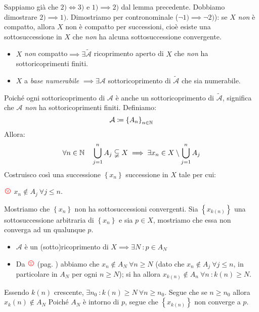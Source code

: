 \begin{demonstration}
Sappiamo già che $2)\iff 3)$ e $1)\implies 2)$ dal lemma precedente. Dobbiamo dimostrare $2)\implies 1)$. Dimostriamo per contronominale ($\neg 1)\implies \neg 2)$): se $X$ \textit{non} è compatto, allora $X$ non è compatto per successioni, cioè esiste una sottosuccessione in $X$ che \textit{non} ha alcuna sottosuccessione convergente.\\
\begin{itemize}
	\item $X$ \textit{non} compatto$\implies \exists \widetilde{\mathcal{A}}$ ricoprimento aperto di $X$ che \textit{non} ha sottoricoprimenti finiti.
	\item $X$ a \textit{base numerabile} $\implies\exists\mathcal{A}$ sottoricoprimento di $\widetilde{\mathcal{A}}$ che sia numerabile.
\end{itemize}
Poiché ogni sottoricoprimento di $\mathcal{A}$ è anche un sottoricoprimento di $\widetilde{\mathcal{A}}$, significa che $\mathcal{A}$ \textit{non} ha sottoricoprimenti finiti. Definiamo:
\begin{equation*}
\mathcal{A}\coloneqq\left\{A_n\right\}_{n\in\mathbb{N}}
\end{equation*}
Allora:
\begin{equation*}
\forall n\in\mathbb{N}\quad \mathop{{\bigcup}}\displaylimits_{j=1}^n A_j\subsetneqq X\implies \exists x_n\in X\setminus \mathop{{\bigcup}}\displaylimits_{j=1}^n A_j
\end{equation*}
Costruisco così una successione $\left\{x_n\right\}$ successione in $X$ tale per cui:
\begin{center}
	\label{notatriste} $\textcolor{red}{{\large \frownie{}}}$ $x_n\notin A_j\ \forall j\leq n$.
\end{center}
Mostriamo che $\left\{x_n\right\}$ non ha sottosuccessioni convergenti. Sia $\left\{x_{k\left(n\right)}\right\}$ una sottosuccessione arbitraria di $\left\{x_n\right\}$ e sia $p\in X$, mostriamo che essa non converga ad un qualunque $p$.\\
\begin{itemize}
	\item $\mathcal{A}$ è un (sotto)ricoprimento di $X\implies \exists N\ \colon p\in A_N$
	\item Da $\textcolor{red}{{\large \frownie{}}}$ (pag. \pageref{notatriste}) abbiamo che $x_n \notin A_N \ \forall n\geq N$  (dato che $x_n \notin A_j \ \forall j\leq n$, in particolare in $A_N$ per ogni $n\geq N$); si ha allora $x_{k\left(n\right)}\notin A_n\ \forall n\ \colon k\left(n\right)\geq N$.
\end{itemize}
Essendo $k\left(n\right)$ crescente, $\exists n_0\ \colon k\left(n\right)\geq N\ \forall n\geq n_0$. Segue che se $n\geq n_0$ allora $x_k\left(n\right)\notin A_N$
Poiché $A_N$ è intorno di $p$, segue che $\left\{x_{k\left(n\right)}\right\}$ non converge a $p$.
\end{demonstration}
